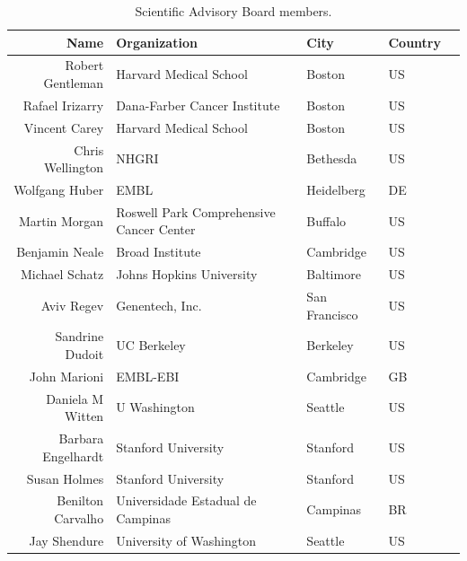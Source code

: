 \documentclass[letterpaper]{article}
\begin{document}
\begin{table}[ht]
\centering
\caption{Scientific Advisory Board members.}
\label{sabtable}
\begin{tabular}{rllll}
  \hline
 Name & Organization & City & Country \\ 
  \hline
 Robert Gentleman & Harvard Medical School & Boston & US \\ 
 Rafael Irizarry & Dana-Farber Cancer Institute & Boston & US \\ 
 Vincent Carey & Harvard Medical School & Boston & US \\ 
 Chris Wellington & NHGRI & Bethesda & US \\ 
 Wolfgang Huber & EMBL  & Heidelberg & DE \\ 
 Martin Morgan & Roswell Park Comprehensive Cancer Center & Buffalo & US \\ 
 Benjamin Neale & Broad Institute & Cambridge & US \\ 
 Michael Schatz & Johns Hopkins University & Baltimore & US \\ 
 Aviv Regev & Genentech, Inc. & San Francisco & US \\ 
 Sandrine Dudoit & UC Berkeley & Berkeley & US \\ 
 John Marioni & EMBL-EBI & Cambridge & GB \\ 
 Daniela M Witten & U Washington & Seattle & US \\ 
 Barbara Engelhardt & Stanford University & Stanford & US \\ 
 Susan Holmes & Stanford University & Stanford & US \\ 
 Benilton Carvalho & Universidade Estadual de Campinas & Campinas & BR \\ 
 Jay Shendure & University of Washington & Seattle & US \\ 
   \hline
\end{tabular}
\end{table}
\end{document}
